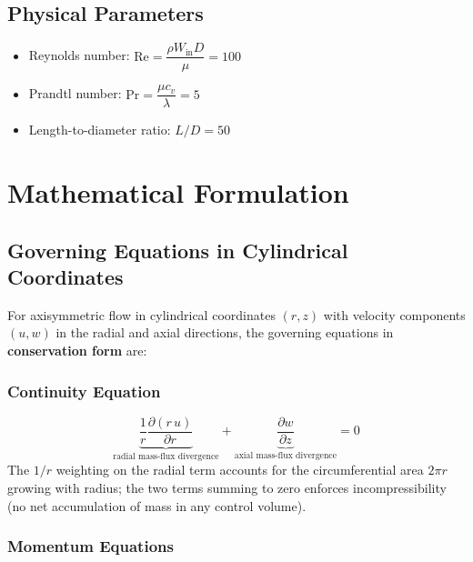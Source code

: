 \documentclass[12pt,a4paper]{article}
\newcommand{\parder}[2]{\frac{\partial #1}{\partial #2}}
\newcommand{\Rey}{\text{Re}}
\newcommand{\Pran}{\text{Pr}}
\begin{document}
\subsection{Physical Parameters}

\begin{itemize}
    \item Reynolds number: $\Rey = \dfrac{\rho W_{\text{in}} D}{\mu} = 100$
    \item Prandtl number: $\Pran = \dfrac{\mu c_v}{\lambda} = 5$
    \item Length-to-diameter ratio: $L/D = 50$
\end{itemize}

\newpage

\section{Mathematical Formulation}

\subsection{Governing Equations in Cylindrical Coordinates}

For axisymmetric flow in cylindrical coordinates $(r, z)$ with velocity components $(u, w)$ in the radial and axial directions, the governing equations in \textbf{conservation form} are:

\subsubsection{Continuity Equation}

\begin{equation}
    \underbrace{\frac{1}{r}\parder{(r\,u)}{r}}_{\text{radial mass-flux divergence}}
    + \underbrace{\parder{w}{z}}_{\text{axial mass-flux divergence}} = 0
    \label{eq:continuity_dim}
\end{equation}
The $1/r$ weighting on the radial term accounts for the circumferential area
$2\pi r$ growing with radius; the two terms summing to zero enforces
incompressibility (no net accumulation of mass in any control volume).

\subsubsection{Momentum Equations}
\end{document}
